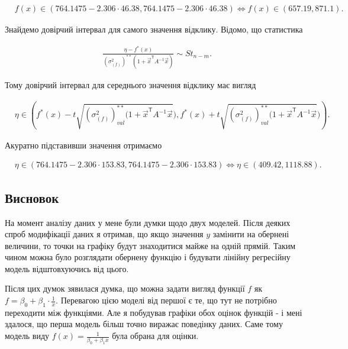 \documentclass[14pt,a4paper]{scrartcl}
\theoremstyle{definition}
\theoremstyle{remark}
\theoremstyle{definition}
\theoremstyle{definition}
\begin{document}
\begin{align*}
  & f(x) \in \left( 764.1475 - 2.306 \cdot 46.38, 764.1475 - 2.306 \cdot 46.38  \right) \Leftrightarrow f(x) \in \left( 657.19, 871.1  \right).
\end{align*}

Знайдемо довірчий інтервал для самого значення відклику. Відомо, що статистика

\begin{align*}
  & \frac{\eta - f^{*}(x)}{(\sigma_{(f)}^2)^{**} (1 + \vec{x}^\mathsf{T} A^{-1} \vec{x})} \sim St_{n - m}.
\end{align*}

Тому довірчий інтервал для середнього значення відклику має вигляд

\begin{align*}
  & \eta \in \left( f^{*}(x) - t\sqrt{(\sigma_{(f)}^2)^{**}_{val} (1 + \vec{x}^\mathsf{T} A^{-1} \vec{x}}), f^{*}(x) + t\sqrt{(\sigma_{(f)}^2)^{**}_{val} (1 + \vec{x}^\mathsf{T} A^{-1} \vec{x}})  \right).
\end{align*}

Акуратно підставивши значення отримаємо

\begin{align*}
  & \eta \in \left( 764.1475 - 2.306 \cdot 153.83, 764.1475 - 2.306 \cdot 153.83  \right) \Leftrightarrow \eta \in \left( 409.42, 1118.88  \right).
\end{align*}

\subsection{Висновок}

На момент аналізу даних у мене були думки щодо двух моделей. Після деяких спроб модифікації даних я отримав, що якщо значення $y$ замінити на обернені величини, то точки на графіку будут знаходитися майже на одній прямій. Таким чином можна було розглядати обернену функцію і будувати лінійну регресійну модель відштовхуючись від цього.

Після цих думок з\textquotesingle явилася думка, що можна задати вигляд функції $f$ як $f = \beta_{0} + \beta_{1} \cdot \frac{1}{x}$. Перевагою цією моделі від першої є те, що тут не потрібно переходити між функціями. Але я побудував графіки обох оцінок функцій - і мені здалося, що перша модель більш точно виражає поведінку даних. Саме тому модель виду $f(x) = \frac{1}{\beta_{0} + \beta_{1} x}$ була обрана для оцінки.

\newpage
\end{document}
